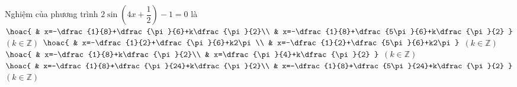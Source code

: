 \begin{ex}%
	 Nghiệm của phương trình $2\sin\left(4x+\dfrac{1}{2}\right)-1=0$ là
	\choice 
		 {$\hoac{
		&  x=-\dfrac{1}{8}+\dfrac{\pi}{6}+k\dfrac{\pi}{2}\\
		&  x=-\dfrac{1}{8}+\dfrac{5\pi}{6}+k\dfrac{\pi}{2}
		}$ $(k\in\mathbb{Z})$} 
		{$\hoac{ 
		 & x=-\dfrac{1}{2}+\dfrac{\pi}{6}+k2\pi\\
		 & x=-\dfrac{1}{2}+\dfrac{5\pi}{6}+k2\pi
		}$  $(k\in\mathbb{Z})$}
		 {$\hoac{
		&  x=-\dfrac{1}{8}+k\dfrac{\pi}{2}\\
		& x=\dfrac{\pi}{4}+k\dfrac{\pi}{2} 
		}$ $(k\in\mathbb{Z})$} 
		{\True  $\hoac{
		&  x=-\dfrac{1}{8}+\dfrac{\pi}{24}+k\dfrac{\pi}{2}\\
		& x=-\dfrac{1}{8}+\dfrac{5\pi}{24}+k\dfrac{\pi}{2} 
		 }$ $(k\in\mathbb{Z})$}
\end{ex}

